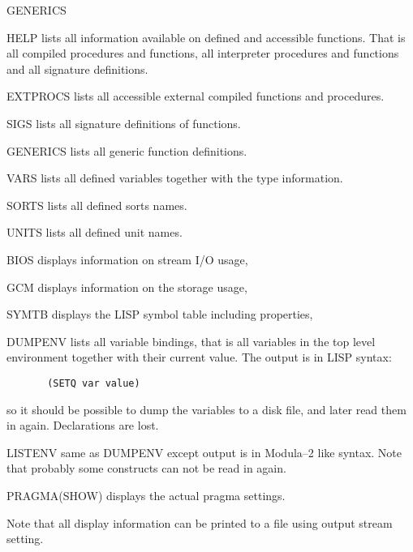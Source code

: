 \begin{deflist}{GENERICS}
\item[HELP\index{HELP}] lists all information available on 
      defined and accessible functions.
      That is all compiled procedures and functions,  
      all interpreter procedures and functions   
      and all signature definitions.
\item[EXTPROCS\index{EXTPROCS}] lists all accessible external 
      compiled functions and procedures.
\item[SIGS\index{SIGS}] lists all 
      signature definitions 
      of functions.
\item[GENERICS\index{GENERICS}] lists all generic 
      function definitions.
\item[VARS\index{VARS}] lists all defined variables
      together with the type information. 
\item[SORTS\index{SORTS}] lists all defined 
      sorts names. 
\item[UNITS\index{UNITS}] lists all defined 
      unit names. 

\item[BIOS\index{BIOS}] displays information on stream I/O usage, 
\item[GCM\index{GCM}] displays information on the 
      storage usage, 
\item[SYMTB\index{SYMTB}] displays the LISP symbol 
      table including properties, 
\item[DUMPENV\index{DUMPENV}] lists all variable bindings, 
      that is all variables in the top level 
      environment together
      with their current value. The output is in LISP syntax:
\begin{verbatim}
       (SETQ var value)
\end{verbatim}
      so it should be possible to dump the variables to a disk
      file, and later read them in again.  
      Declarations are lost.
\item[LISTENV\index{LISTENV}] same as DUMPENV except output is in 
      Modula--2 like syntax. 
      Note that probably some constructs can not be read in again.
\item[PRAGMA(SHOW)\index{PRAGMA}\index{SHOW}] 
      displays the actual pragma settings.
\end{deflist}

Note that all display information can be 
printed to a file using output stream setting. 


